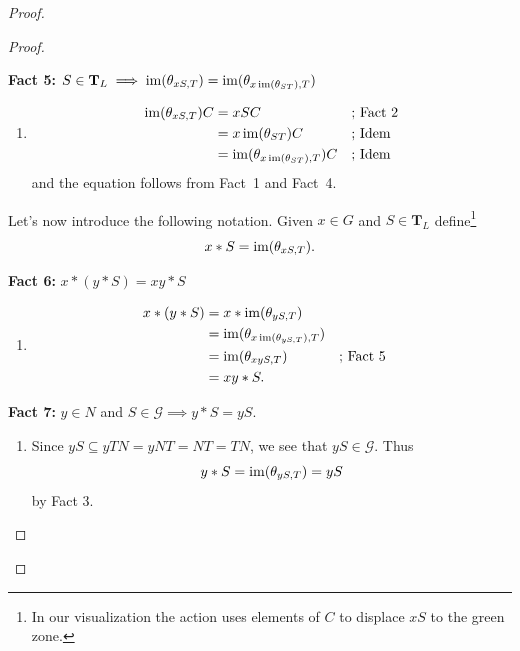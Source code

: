 \begin{proof}
\begin{proof}
\begin{enumerate}[a),font=\upshape]
    \textbf{Fact 5:} $S\in\mathbf T_L\implies \operatorname{im}(\theta_{xS,T})=\operatorname{im}(\theta_{x\operatorname{im}(\theta_{ST}),T})$


    {\small
    \begin{enumerate}
        \item[$\to$]
        \begin{align*}
            \operatorname{im}(\theta_{xS,T})C &= xSC  &&\text{; Fact 2}\\
                &= x\operatorname{im}(\theta_{ST})C   &&\text{; Idem}\\
                &= \operatorname{im}(\theta_{x\operatorname{im}(\theta_{ST}),T})C   &&\text{; Idem}
        \end{align*}
        and the equation follows from Fact~1 and Fact~4.
    \end{enumerate}
    }

    \medskip
    
    Let's now introduce the following notation. Given $x\in G$ and $S\in\mathbf T_L$ define\footnote{In our visualization the action uses elements of $C$ to displace $xS$ to the green zone.}
    $$
        x\ast S = \operatorname{im}(\theta_{xS,T}).
    $$

    \medskip
    
    \textbf{Fact 6:} $x\ast(y\ast S) = xy\ast S$

    {\small
        \begin{enumerate}
        \item[$\to$]
        \begin{align*}
                x\ast(y\ast S) &= x\ast\operatorname{im}(\theta_{yS,T})\\
                    &= \operatorname{im}(\theta_{x\operatorname{im}(\theta_{yS,T}),T})\\
                    &= \operatorname{im}(\theta_{xyS,T})   &&\text{; Fact 5}\\
                    &= xy\ast S.
        \end{align*}
    \end{enumerate}
    }

    \textbf{Fact 7:} $y\in N$ and $S\in\mathcal G\implies y\ast S=yS$.

    {\small
    \begin{enumerate}
        \item[$\to$]
        Since $yS\subseteq yTN=yNT=NT=TN$, we see that $yS\in\mathcal G$. Thus
        $$
            y\ast S = \operatorname{im}(\theta_{yS,T}) = yS
        $$
        by Fact 3.
        \end{enumerate}
    }
    

\end{enumerate}
\end{proof}
\end{proof}

